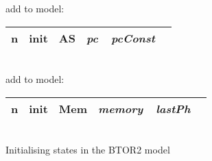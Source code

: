 \begin{algorithm}
    add to model:\\
    \begin{tabular}[h]{>{\ttfamily\color{UniRed}}r >{\ttfamily}l >{\ttfamily\color{UniGrey}}l >{\slshape\color{UniRed}}l >{\slshape} l}
        \hline
        \hline
        \ttfamily
        n & init & AS & pc\ \ pcConst & \\
        \hline
        \hline
    \end{tabular}\\
    \BlankLine
    \BlankLine
    add to model:\\
    \begin{tabular}[h]{>{\ttfamily\color{UniRed}}r >{\ttfamily}l >{\ttfamily\color{UniGrey}}l >{\slshape\color{UniRed}}l >{\slshape} l}
        \hline
        \hline
        \ttfamily
        n & init & Mem & memory\ \ lastPh & \\
        \hline
        \hline
    \end{tabular}\\
    \caption[Initialising states]{Initialising states in the BTOR2 model}\label{alg:initstate}
\end{algorithm}